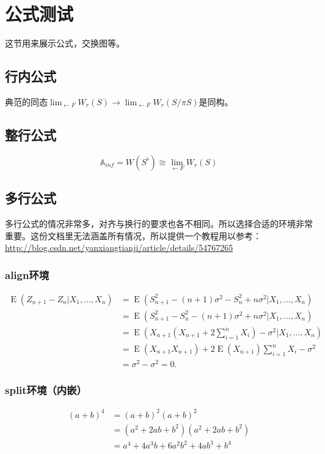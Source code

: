 \section{公式测试}这节用来展示公式，交换图等。
 
\subsection{行内公式}
典范的同态$\lim_{\leftarrow F} W_r(S)\rightarrow \lim_{\leftarrow F} W_r(S/\pi S )$是同构。

\subsection{整行公式}
$$\mathbb{A}_{inf}=W(S^\flat)\cong \lim_{\leftarrow F} W_r(S)$$

\subsection{多行公式}
\begin{sloppypar}
多行公式的情况非常多，对齐与换行的要求也各不相同。所以选择合适的环境非常重要。这份文档里无法涵盖所有情况，所以提供一个教程用以参考：\url{http://blog.csdn.net/yanxiangtianji/article/details/54767265}
\end{sloppypar}



\subsubsection{align环境}
\begin{align*}
    \operatorname{E} (Z_{n+1} - Z_n | X_1,..., X_n)
    &= \operatorname{E} (S_{n+1}^2 - (n+1) \sigma^2 - S_n^2 + n \sigma^2 | X_1,..., X_n) \\
    &= \operatorname{E} (S_{n+1}^2 - S_n^2 - (n+1) \sigma^2 + n \sigma^2 | X_1,..., X_n) \\
    &= \operatorname{E} (X_{n+1}(X_{n+1} + 2\sum_{i=1}^n X_i) - \sigma^2 | X_1,..., X_n) \\
    &= \operatorname{E} (X_{n+1}X_{n+1})
       + 2\operatorname{E} (X_{n+1}) \sum_{i=1}^n X_i - \sigma^2 \\
    &= \sigma^2  - \sigma^2 =0.
\end{align*}

\subsubsection{split环境（内嵌）}
\begin{equation*}
    \begin{split}
    (a + b)^4
      &= (a + b)^2 (a + b)^2      \\
      &= (a^2 + 2ab + b^2)
         (a^2 + 2ab + b^2)        \\
      &= a^4 + 4a^3b + 6a^2b^2 + 4ab^3 + b^4
    \end{split}
\end{equation*}

